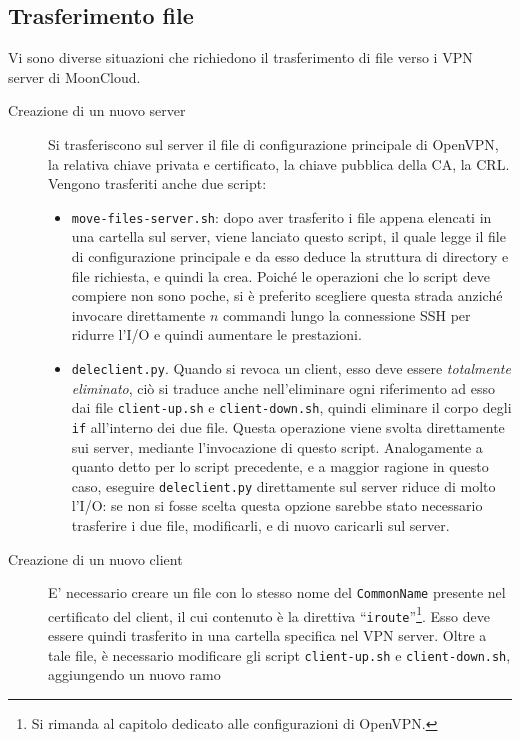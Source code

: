\subsection{Trasferimento file}
Vi sono diverse situazioni che richiedono il trasferimento di file
verso i VPN server di MoonCloud.
\begin{description}
	\item[Creazione di un nuovo server]Si trasferiscono sul server il file
	di configurazione principale di OpenVPN, la relativa chiave privata e certificato,
	la chiave pubblica della CA, la CRL.
	Vengono trasferiti anche due script:
	\begin{itemize}
		\item \texttt{move-files-server.sh}: dopo aver trasferito i file appena elencati
		      in una cartella sul server, viene lanciato questo script, il quale legge il file
		      di configurazione principale e da esso deduce la struttura di directory e file
		      richiesta, e quindi la crea.
		      Poiché le operazioni che lo script deve compiere non sono poche, si è
		      preferito scegliere questa strada anziché invocare direttamente $n$ commandi 
		      lungo la connessione SSH per ridurre l'I/O e quindi aumentare le prestazioni.
		\item \texttt{deleclient.py}. Quando si revoca un client, esso deve essere
		      \textit{totalmente eliminato}, ciò si traduce anche nell'eliminare ogni riferimento
		      ad esso dai file \texttt{client-up.sh} e \texttt{client-down.sh}, quindi eliminare
		      il corpo degli \texttt{if} all'interno dei due file. Questa operazione viene
		      svolta direttamente sui server, mediante l'invocazione di questo script.
		      Analogamente a quanto detto per lo script precedente, e a maggior ragione in questo
		      caso, eseguire \texttt{deleclient.py} direttamente sul server riduce di molto l'I/O:
		      se non si fosse scelta questa opzione sarebbe stato necessario trasferire i due file,
		      modificarli, e di nuovo caricarli sul server.
	\end{itemize}
	\item[Creazione di un nuovo client]E' necessario creare un file con lo stesso
	nome del \texttt{CommonName} presente nel certificato del client, il cui
	contenuto è la direttiva ``\texttt{iroute}''\footnote{Si rimanda al capitolo dedicato
	alle configurazioni di OpenVPN.}. Esso deve essere quindi trasferito in una cartella
	specifica nel VPN server. Oltre a tale file, è necessario modificare gli script
	\texttt{client-up.sh} e \texttt{client-down.sh}, aggiungendo un nuovo ramo

\end{description}
